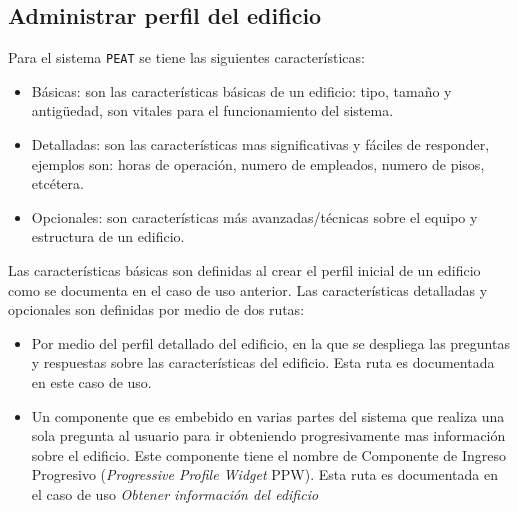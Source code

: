 
\subsection{Administrar perfil del edificio}

Para el sistema \texttt{PEAT} se tiene las siguientes características:
\begin{itemize}
\item Básicas: son las características básicas de un edificio: tipo, tamaño y
  antigüedad, son vitales para el funcionamiento del sistema.
\item Detalladas: son las características mas significativas y fáciles de
  responder, ejemplos son: horas de operación, numero de empleados, numero
  de pisos, etcétera.
\item Opcionales: son características más avanzadas/técnicas sobre el equipo
  y estructura de un edificio.
\end{itemize}

Las características básicas son definidas al crear el perfil inicial de un
edificio como se documenta en el caso de uso anterior. Las características
detalladas y opcionales son definidas por medio de dos rutas:

\begin{itemize}
\item Por medio del perfil detallado del edificio, en la que se despliega
  las preguntas y respuestas sobre las características del edificio.
  Esta ruta es documentada en este caso de uso.
\item Un componente que es embebido en varias partes del sistema
  que realiza una sola pregunta al usuario para ir obteniendo progresivamente
  mas información sobre el edificio. Este componente tiene el nombre
  de Componente de Ingreso Progresivo (\textit{Progressive Profile Widget} PPW).
  Esta ruta es documentada en el caso de uso \textit{Obtener información
    del edificio}
\end{itemize}

